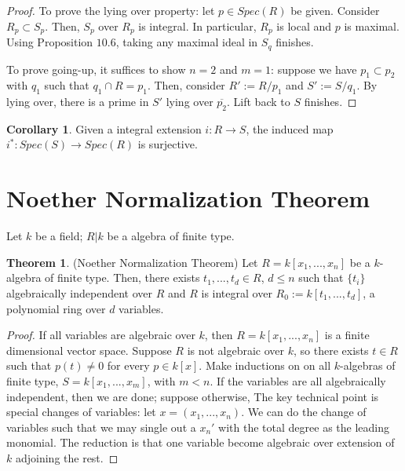 \documentclass{article}
\theoremstyle{definition}
\newtheorem{theorem}{Theorem}[section]
\theoremstyle{definition}
\theoremstyle{definition}
\theoremstyle{definition}
\theoremstyle{definition}
\theoremstyle{definition}
\newtheorem{corollary}{Corollary}[theorem]
\theoremstyle{definition}
\begin{document}
\begin{proof}
   To prove the lying over property: let $p\in Spec(R)$ be given. Consider $R_p\subset S_p$. Then, $S_p$ over $R_p$ is integral. In particular, $R_p$ is local and $p$ is maximal. Using Proposition $10.6$, taking any maximal ideal in $S_q$ finishes. 

   To prove going-up, it suffices to show $n=2$ and $m=1$: suppose we have $p_1\subset p_2$ with $q_1$ such that $q_1\cap R=p_1$. Then, consider $R':=R/p_1$ and $S':=S/q_1$. By lying over, there is a prime in $S'$ lying over $\overline{p_2}$. Lift back to $S$ finishes.
   
   
   

\end{proof}


\begin{tcolorbox}[colback=green!5!white,colframe=green!30!white]
\begin{corollary}
Given a integral extension $i: R\to S$, the induced map $i^*: Spec(S)\to Spec(R)$ is surjective.
\end{corollary}
\end{tcolorbox}

\section{Noether Normalization Theorem}
Let $k$ be a field; $R|k$ be a algebra of finite type. 


\begin{tcolorbox}[colback=red!5!white,colframe=red!30!white]
\begin{theorem}
(Noether Normalization Theorem) Let $R=k[x_1,...,x_n]$ be a $k$-algebra of finite type. Then, there exists $t_1,...,t_d\in R$, $d\leq n$ such that $\{t_i\}$ algebraically independent over $R$ and $R$ is integral over $R_0:=k[t_1,...,t_d]$, a polynomial ring over $d$ variables.  
\end{theorem}
\end{tcolorbox}
\begin{proof}
If all variables are algebraic over $k$, then $R=k[x_1,...,x_n]$ is a finite dimensional vector space. Suppose $R$ is not algebraic over $k$, so there exists $t\in R$ such that $p(t)\neq 0$ for every $p\in k[x]$. Make inductions on on all $k$-algebras of finite type, $S=k[x_1,...,x_m]$, with $m<n$. If the variables are all algebraically independent, then we are done; suppose otherwise, The key technical point is special changes of variables: let $x=(x_1,...,x_n)$. We can do the change of variables such that we may single out a $x_n'$ with the total degree as the leading monomial. The reduction is that one variable become algebraic over extension of $k$ adjoining the rest. 
\end{proof}
\end{document}
